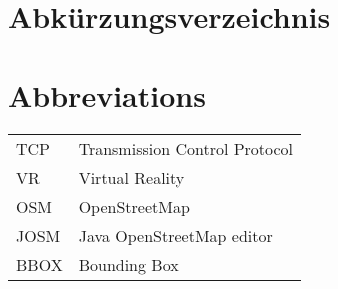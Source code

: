 \ifmmtlanguagegerman
\section*{Abkürzungsverzeichnis}
\else
\section*{Abbreviations}
\fi

\begin{table}[h]		
	\begin{tabular}{ll}
		TCP & Transmission Control Protocol \\
		VR & Virtual Reality \\
		OSM & OpenStreetMap \\
		JOSM & Java OpenStreetMap editor \\
		BBOX & Bounding Box \\
	\end{tabular}
\end{table}
